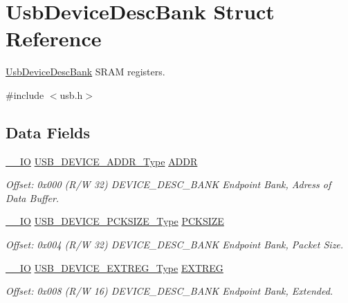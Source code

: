 \hypertarget{struct_usb_device_desc_bank}{}\section{Usb\+Device\+Desc\+Bank Struct Reference}
\label{struct_usb_device_desc_bank}


\mbox{\hyperlink{struct_usb_device_desc_bank}{Usb\+Device\+Desc\+Bank}} S\+R\+AM registers.  




{\ttfamily \#include $<$usb.\+h$>$}

\subsection*{Data Fields}
\begin{DoxyCompactItemize}
\item 
\mbox{\hyperlink{core__cm0plus_8h_aec43007d9998a0a0e01faede4133d6be}{\+\_\+\+\_\+\+IO}} \mbox{\hyperlink{union_u_s_b___d_e_v_i_c_e___a_d_d_r___type}{U\+S\+B\+\_\+\+D\+E\+V\+I\+C\+E\+\_\+\+A\+D\+D\+R\+\_\+\+Type}} \mbox{\hyperlink{struct_usb_device_desc_bank_ac4e95e16d23e6497f99e97a6f9d0871e}{A\+D\+DR}}
\begin{DoxyCompactList}\small\item\em Offset\+: 0x000 (R/W 32) D\+E\+V\+I\+C\+E\+\_\+\+D\+E\+S\+C\+\_\+\+B\+A\+NK Endpoint Bank, Adress of Data Buffer. \end{DoxyCompactList}\item 
\mbox{\hyperlink{core__cm0plus_8h_aec43007d9998a0a0e01faede4133d6be}{\+\_\+\+\_\+\+IO}} \mbox{\hyperlink{union_u_s_b___d_e_v_i_c_e___p_c_k_s_i_z_e___type}{U\+S\+B\+\_\+\+D\+E\+V\+I\+C\+E\+\_\+\+P\+C\+K\+S\+I\+Z\+E\+\_\+\+Type}} \mbox{\hyperlink{struct_usb_device_desc_bank_a3b250154bc654a92ad466699f38b5f1d}{P\+C\+K\+S\+I\+ZE}}
\begin{DoxyCompactList}\small\item\em Offset\+: 0x004 (R/W 32) D\+E\+V\+I\+C\+E\+\_\+\+D\+E\+S\+C\+\_\+\+B\+A\+NK Endpoint Bank, Packet Size. \end{DoxyCompactList}\item 
\mbox{\hyperlink{core__cm0plus_8h_aec43007d9998a0a0e01faede4133d6be}{\+\_\+\+\_\+\+IO}} \mbox{\hyperlink{union_u_s_b___d_e_v_i_c_e___e_x_t_r_e_g___type}{U\+S\+B\+\_\+\+D\+E\+V\+I\+C\+E\+\_\+\+E\+X\+T\+R\+E\+G\+\_\+\+Type}} \mbox{\hyperlink{struct_usb_device_desc_bank_a2fdbc64be3006a088569d7647a3dab67}{E\+X\+T\+R\+EG}}
\begin{DoxyCompactList}\small\item\em Offset\+: 0x008 (R/W 16) D\+E\+V\+I\+C\+E\+\_\+\+D\+E\+S\+C\+\_\+\+B\+A\+NK Endpoint Bank, Extended. \end{DoxyCompactList}\item 

\end{DoxyCompactItemize}
